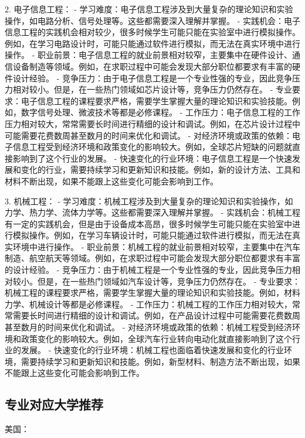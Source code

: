 \documentclass[12pt]{article}
\begin{document}
\begin{CJK*}{UTF8}{gbsn}
2. 电子信息工程：
   - 学习难度：电子信息工程涉及到大量复杂的理论知识和实验操作，如电路分析、信号处理等。这些都需要深入理解并掌握。
   - 实践机会：电子信息工程的实践机会相对较少，很多时候学生可能只能在实验室中进行模拟操作。例如，在学习电路设计时，可能只能通过软件进行模拟，而无法在真实环境中进行操作。
   - 职业前景：电子信息工程的就业前景相对较窄，主要集中在硬件设计、通信设备制造等领域。例如，在求职过程中可能会发现大部分职位都要求有丰富的硬件设计经验。
   - 竞争压力：由于电子信息工程是一个专业性强的专业，因此竞争压力相对较小。但是，在一些热门领域如芯片设计等，竞争压力仍然存在。
   - 专业要求：电子信息工程的课程要求严格，需要学生掌握大量的理论知识和实验技能。例如，数字信号处理、微波技术等都是必修课程。
   - 工作压力：电子信息工程的工作压力相对较大，常常需要长时间进行精细的设计和调试。例如，在芯片设计过程中可能需要花费数周甚至数月的时间来优化和调试。
   - 对经济环境或政策的依赖：电子信息工程受到经济环境和政策变化的影响较大。例如，全球芯片短缺的问题就直接影响到了这个行业的发展。
   - 快速变化的行业环境：电子信息工程是一个快速发展和变化的行业，需要持续学习和更新知识和技能。例如，新的设计方法、工具和材料不断出现，如果不能跟上这些变化可能会影响到工作。

3. 机械工程：
   - 学习难度：机械工程涉及到大量复杂的理论知识和实验操作，如力学、热力学、流体力学等。这些都需要深入理解并掌握。
   - 实践机会：机械工程有一定的实践机会，但是由于设备成本高昂，很多时候学生可能只能在实验室中进行模拟操作。例如，在学习车辆设计时，可能只能通过软件进行模拟，而无法在真实环境中进行操作。
   - 职业前景：机械工程的就业前景相对较窄，主要集中在汽车制造、航空航天等领域。例如，在求职过程中可能会发现大部分职位都要求有丰富的设计经验。
   - 竞争压力：由于机械工程是一个专业性强的专业，因此竞争压力相对较小。但是，在一些热门领域如汽车设计等，竞争压力仍然存在。
   - 专业要求：机械工程的课程要求严格，需要学生掌握大量的理论知识和实验技能。例如，材料力学、机械设计等都是必修课程。
   - 工作压力：机械工程的工作压力相对较大，常常需要长时间进行精细的设计和调试。例如，在产品设计过程中可能需要花费数周甚至数月的时间来优化和调试。
   - 对经济环境或政策的依赖：机械工程受到经济环境和政策变化的影响较大。例如，全球汽车行业转向电动化就直接影响到了这个行业的发展。
   - 快速变化的行业环境：机械工程也面临着快速发展和变化的行业环境，需要持续学习和更新知识和技能。例如，新型材料、制造方法不断出现，如果不能跟上这些变化可能会影响到工作。

   \newpage
   \subsection*{专业对应大学推荐}
   美国：


\end{CJK*}
\end{document}
